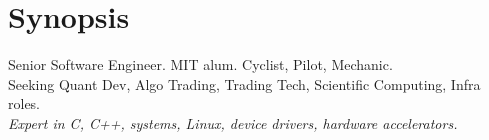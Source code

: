 \section{Synopsis}
Senior Software Engineer. MIT alum. Cyclist, Pilot, Mechanic.\\
Seeking Quant Dev, Algo Trading, Trading Tech, Scientific Computing, Infra roles. \\
\emph{Expert in C, C++, systems, Linux, device drivers, hardware accelerators.}
